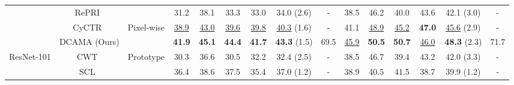 \documentclass[runningheads,table,xcdraw]{llncs}
\begin{document}
\begin{table*}[t]
{\begin{tabular}{ccccccccccccccc}
\multicolumn{1}{c|}{}                            & \multicolumn{1}{c|}{RePRI~\cite{boudiaf2021few}}                    & \multicolumn{1}{c|}{}                            & 31.2          & 38.1          & 33.3          & \multicolumn{1}{c|}{33.0}          & \multicolumn{1}{c|}{34.0 (2.6)}          & \multicolumn{1}{c|}{-}             & 38.5          & 46.2          & 40.0          & \multicolumn{1}{c|}{43.6}          & \multicolumn{1}{c|}{42.1 (3.0)}          & -             \\ \cline{2-15}
\multicolumn{1}{c|}{}                            & \multicolumn{1}{c|}{CyCTR~\cite{zhang2021few}}               & \multicolumn{1}{c|}{\multirow{2}{*}{Pixel-wise}} & \uline{38.9}  & \uline{43.0}  & \uline{39.6}  & \multicolumn{1}{c|}{\uline{39.8}}  & \multicolumn{1}{c|}{\uline{40.3} (1.6)}  & \multicolumn{1}{c|}{-}             & 41.1          & \uline{48.9}  & \uline{45.2}  & \multicolumn{1}{c|}{\textbf{47.0}} & \multicolumn{1}{c|}{\uline{45.6} (2.9)}  & -             \\
\multicolumn{1}{c|}{}                            & \multicolumn{1}{c|}{DCAMA (Ours)}                            & \multicolumn{1}{c|}{}                            & \textbf{41.9} & \textbf{45.1} & \textbf{44.4} & \multicolumn{1}{c|}{\textbf{41.7}} & \multicolumn{1}{c|}{\textbf{43.3} (1.5)} & \multicolumn{1}{c|}{69.5}          & \uline{45.9}  & \textbf{50.5} & \textbf{50.7} & \multicolumn{1}{c|}{\uline{46.0}}  & \multicolumn{1}{c|}{\textbf{48.3} (2.3)} & 71.7          \\ \hline
\multicolumn{1}{c|}{\multirow{6}{*}{ResNet-101}} & \multicolumn{1}{c|}{CWT~\cite{lu2021simpler}}                & \multicolumn{1}{c|}{\multirow{3}{*}{Prototype}}  & 30.3          & 36.6          & 30.5          & \multicolumn{1}{c|}{32.2}          & \multicolumn{1}{c|}{32.4 (2.5)}          & \multicolumn{1}{c|}{-}             & 38.5          & 46.7          & 39.4          & \multicolumn{1}{c|}{43.2}          & \multicolumn{1}{c|}{42.0 (3.3)}          & -             \\
\multicolumn{1}{c|}{}                            & \multicolumn{1}{c|}{SCL~\cite{zhang2021self}}                       & \multicolumn{1}{c|}{}                            & 36.4          & 38.6          & 37.5          & \multicolumn{1}{c|}{35.4}          & \multicolumn{1}{c|}{37.0 (1.2)}          & \multicolumn{1}{c|}{-}             & 38.9          & 40.5          & 41.5          & \multicolumn{1}{c|}{38.7}          & \multicolumn{1}{c|}{39.9 (1.2)}          & -             \\

\end{tabular}}
\end{table*}
\end{document}

